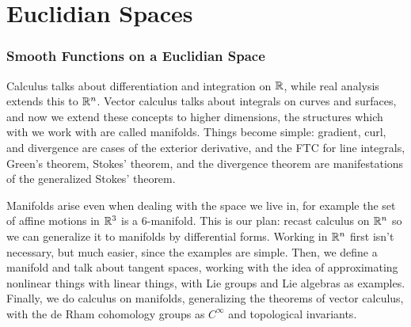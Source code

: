 \newpage
\part{Euclidian Spaces}
\section{Smooth Functions on a Euclidian Space}
\begin{center}
\end{center}
Calculus talks about differentiation and integration on $\mathbb{R}$, while real analysis extends this to $\mathbb{R}^n $. Vector calculus talks about integrals on curves and surfaces, and now we extend these concepts to higher dimensions, the structures which with we work with are called manifolds. Things become simple: gradient, curl, and divergence are cases of the exterior derivative, and the FTC for line integrals, Green's theorem, Stokes' theorem, and the divergence theorem are manifestations of the generalized Stokes' theorem.

Manifolds arise even when dealing with the space we live in, for example the set of affine motions in $\mathbb{R}^3$ is a $6$-manifold. This is our plan: recast calculus on $\mathbb{R}^n $ so we can generalize it to manifolds by differential forms. Working in $\mathbb{R}^n $ first isn't necessary, but much easier, since the examples are simple. Then, we define a manifold and talk about tangent spaces, working with the idea of approximating nonlinear things with linear things, with Lie groups and Lie algebras as examples. Finally, we do calculus on manifolds, generalizing the theorems of vector calculus, with the de Rham cohomology groups as $C^{\infty}$ and topological invariants.
\orbreak
